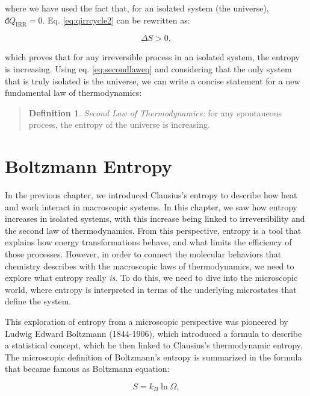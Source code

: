 \documentclass[
  9pt,
]{extbook}
\theoremstyle{definition}
\newtheorem{definition}{Definition}[chapter]
\theoremstyle{definition}
\theoremstyle{definition}
\theoremstyle{definition}
\theoremstyle{remark}
\begin{document}
where we have used the fact that, for an isolated system (the universe), \(đQ_{\mathrm{IRR}}=0\). Eq. \eqref{eq:qirrcycle2} can be rewritten as:

\begin{equation}
\Delta S > 0,
\label{eq:secondlaweq}
\end{equation}

which proves that for any irreversible process in an isolated system, the entropy is increasing. Using eq. \eqref{eq:secondlaweq} and considering that the only system that is truly isolated is the universe, we can write a concise statement for a new fundamental law of thermodynamics:

\begin{quote}
\begin{definition}
\protect\hypertarget{def:secondlawdef}{}\label{def:secondlawdef}\emph{Second Law of Thermodynamics:} for any spontaneous process, the entropy of the universe is increasing.
\end{definition}
\end{quote}

\section{Boltzmann Entropy}\label{boltzmann-entropy}

In the previous chapter, we introduced Clausius's entropy to describe how heat and work interact in macroscopic systems. In this chapter, we saw how entropy increases in isolated systems, with this increase being linked to irreversibility and the second law of thermodynamics. From this perspective, entropy is a tool that explains how energy transformations behave, and what limits the efficiency of those processes. However, in order to connect the molecular behaviors that chemistry describes with the macroscopic laws of thermodynamics, we need to explore what entropy really \emph{is}. To do this, we need to dive into the microscopic world, where entropy is interpreted in terms of the underlying microstates that define the system.

This exploration of entropy from a microscopic perspective was pioneered by Ludwig Edward Boltzmann (1844-1906), which introduced a formula to describe a statistical concept, which he then linked to Clausius's thermodynamic entropy. The microscopic definition of Boltzmann's entropy is summarized in the formula that became famous as Boltzmann equation:

\begin{equation}
S = k_B \ln \Omega,
\label{eq:boltzmanneq}
\end{equation}
\end{document}
